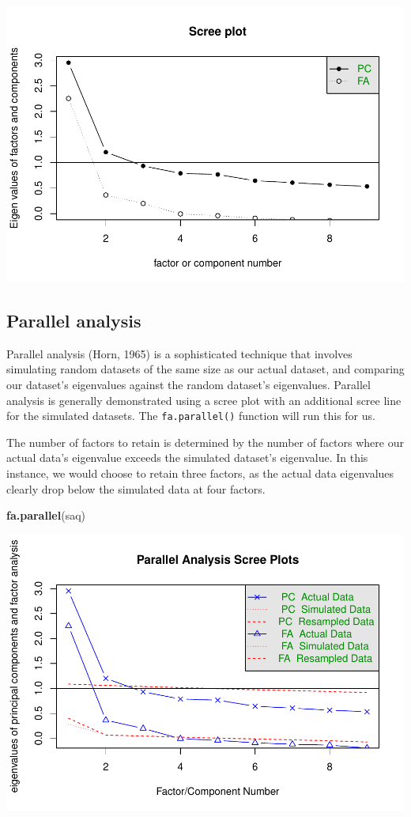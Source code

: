\documentclass[
]{book}
\newenvironment{Shaded}{\begin{snugshade}}{\end{snugshade}}
\newcommand{\FunctionTok}[1]{\textcolor[rgb]{0.13,0.29,0.53}{\textbf{#1}}}
\newcommand{\NormalTok}[1]{#1}
\begin{document}
\includegraphics{_main_files/figure-latex/unnamed-chunk-316-1.pdf}

\hypertarget{parallel-analysis}{%
\subsection{Parallel analysis}\label{parallel-analysis}}

Parallel analysis (Horn, 1965) is a sophisticated technique that involves simulating random datasets of the same size as our actual dataset, and comparing our dataset's eigenvalues against the random dataset's eigenvalues. Parallel analysis is generally demonstrated using a scree plot with an additional scree line for the simulated datasets. The \texttt{fa.parallel()} function will run this for us.

The number of factors to retain is determined by the number of factors where our actual data's eigenvalue exceeds the simulated dataset's eigenvalue. In this instance, we would choose to retain three factors, as the actual data eigenvalues clearly drop below the simulated data at four factors.

\begin{Shaded}
\begin{Highlighting}[]
\FunctionTok{fa.parallel}\NormalTok{(saq)}
\end{Highlighting}
\end{Shaded}

\includegraphics{_main_files/figure-latex/unnamed-chunk-317-1.pdf}
\end{document}
